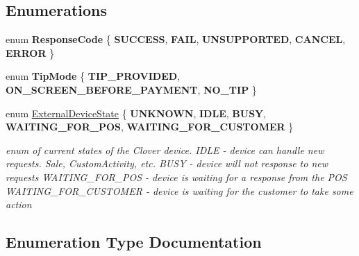 \subsection*{Enumerations}
\begin{DoxyCompactItemize}
\item 
\mbox{\label{namespacecom_1_1clover_1_1remotepay_1_1sdk_ad35c0938efdc4d31c4a040db886ad0f3}} 
enum {\bfseries Response\+Code} \{ \newline
{\bfseries S\+U\+C\+C\+E\+SS}, 
{\bfseries F\+A\+IL}, 
{\bfseries U\+N\+S\+U\+P\+P\+O\+R\+T\+ED}, 
{\bfseries C\+A\+N\+C\+EL}, 
\newline
{\bfseries E\+R\+R\+OR}
 \}
\item 
\mbox{\label{namespacecom_1_1clover_1_1remotepay_1_1sdk_a3d5c6c8529ad6bcdc5a4fd5224361ac5}} 
enum {\bfseries Tip\+Mode} \{ {\bfseries T\+I\+P\+\_\+\+P\+R\+O\+V\+I\+D\+ED}, 
{\bfseries O\+N\+\_\+\+S\+C\+R\+E\+E\+N\+\_\+\+B\+E\+F\+O\+R\+E\+\_\+\+P\+A\+Y\+M\+E\+NT}, 
{\bfseries N\+O\+\_\+\+T\+IP}
 \}
\item 
enum \hyperlink{namespacecom_1_1clover_1_1remotepay_1_1sdk_a9d5838a91e2711306ad561d104fed034}{External\+Device\+State} \{ \newline
{\bfseries U\+N\+K\+N\+O\+WN}, 
{\bfseries I\+D\+LE}, 
{\bfseries B\+U\+SY}, 
{\bfseries W\+A\+I\+T\+I\+N\+G\+\_\+\+F\+O\+R\+\_\+\+P\+OS}, 
\newline
{\bfseries W\+A\+I\+T\+I\+N\+G\+\_\+\+F\+O\+R\+\_\+\+C\+U\+S\+T\+O\+M\+ER}
 \}\begin{DoxyCompactList}\small\item\em enum of current states of the Clover device. I\+D\+LE -\/ device can handle new requests. Sale, Custom\+Activity, etc. B\+U\+SY -\/ device will not response to new requests W\+A\+I\+T\+I\+N\+G\+\_\+\+F\+O\+R\+\_\+\+P\+OS -\/ device is waiting for a response from the P\+OS W\+A\+I\+T\+I\+N\+G\+\_\+\+F\+O\+R\+\_\+\+C\+U\+S\+T\+O\+M\+ER -\/ device is waiting for the customer to take some action \end{DoxyCompactList}
\end{DoxyCompactItemize}


\subsection{Enumeration Type Documentation}
\mbox{\label{namespacecom_1_1clover_1_1remotepay_1_1sdk_a9d5838a91e2711306ad561d104fed034}} 
